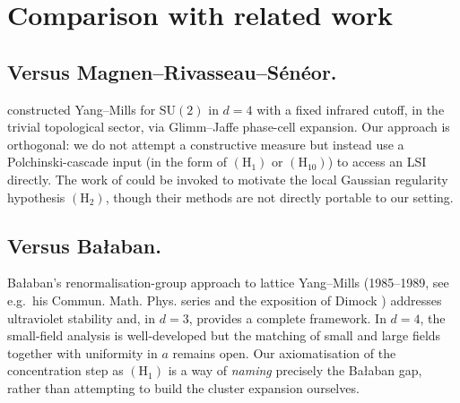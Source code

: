 \documentclass[11pt,reqno]{amsart}
\theoremstyle{plain}
\theoremstyle{definition}
\theoremstyle{remark}
\begin{document}
\section{Comparison with related work}
\label{sec:comparison}

\subsection{Versus Magnen--Rivasseau--S\'en\'eor.}
\cite{MRS93} constructed Yang--Mills for $\mathrm{SU}(2)$ in $d = 4$ with a fixed infrared cutoff, in the trivial topological sector, via Glimm--Jaffe phase-cell expansion. Our approach is orthogonal: we do not attempt a constructive measure but instead use a Polchinski-cascade input (in the form of $(\mathrm{H}_1)$ or $(\mathrm{H}_{10})$) to access an LSI directly. The work of \cite{MRS93} could be invoked to motivate the local Gaussian regularity hypothesis $(\mathrm{H}_2)$, though their methods are not directly portable to our setting.

\subsection{Versus Bałaban.}
Bałaban's renormalisation-group approach to lattice Yang--Mills (1985--1989, see e.g.\ his Commun. Math. Phys. series and the exposition of Dimock \cite{Dimock2011}) addresses ultraviolet stability and, in $d = 3$, provides a complete framework. In $d = 4$, the small-field analysis is well-developed but the matching of small and large fields together with uniformity in $a$ remains open. Our axiomatisation of the concentration step as $(\mathrm{H}_1)$ is a way of \emph{naming} precisely the Bałaban gap, rather than attempting to build the cluster expansion ourselves.
\end{document}
